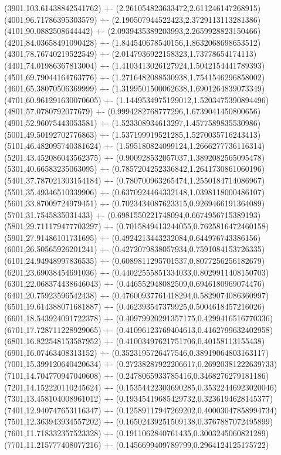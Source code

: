 {(3901,103.61438842541762) +- (2.261054823633472,2.611246147268915)
(4001,96.71786395303579) +- (2.190507944522423,2.3729113113281386)
(4101,90.0882508644442) +- (2.0939435389203993,2.2659928823150466)
(4201,84.03658491090428) +- (1.844540678540156,1.8632068698653512)
(4301,78.76740219522549) +- (2.0147936922158323,1.73778654174113)
(4401,74.01986367813004) +- (1.4103413026127924,1.5042154441789393)
(4501,69.79044164763776) +- (1.2716482088530938,1.7541546296858002)
(4601,65.38070506369999) +- (1.3199501500062638,1.6901264839073349)
(4701,60.961291630070605) +- (1.1449534975129012,1.5203475390894496)
(4801,57.0780792077679) +- (0.9994282768777296,1.6739041450800656)
(4901,52.96075443053581) +- (1.523308934613297,1.4577589835530986)
(5001,49.50192702776863) +- (1.537199919521285,1.5270035716243413)
(5101,46.482095740381624) +- (1.595180824099124,1.2666277736116314)
(5201,43.452086043562375) +- (0.900928532057037,1.3892082565095478)
(5301,40.66583235063095) +- (0.7857204252336842,1.2641730861060196)
(5401,37.787021303154184) +- (0.780700963265474,1.2550184714086967)
(5501,35.49346510339906) +- (0.6370924464332148,1.0398118000486107)
(5601,33.87009724979451) +- (0.7023434087623315,0.9269466191364089)
(5701,31.7545835031433) +- (0.6981550221748094,0.6674956715389193)
(5801,29.711179477703297) +- (0.7015849413244055,0.7625816472460158)
(5901,27.91486101731695) +- (0.4924213443232084,0.644976743386156)
(6001,26.50565926201241) +- (0.4272079838057934,0.7591084153726335)
(6101,24.94948997836535) +- (0.6089811295701537,0.8077256256182679)
(6201,23.69038454691036) +- (0.44022555851334033,0.8029911408150703)
(6301,22.068374438646043) +- (0.446552948082509,0.6946180969074476)
(6401,20.75923596542438) +- (0.47600937761418294,0.5829074086360997)
(6501,19.614388071681887) +- (0.462393547379925,0.5004618457216026)
(6601,18.543924091722378) +- (0.40979920291357175,0.4299416516770336)
(6701,17.728711228929065) +- (0.41096123769404613,0.4162799632402958)
(6801,16.822548153587952) +- (0.41003497621751706,0.40158113155438)
(6901,16.07463408313152) +- (0.3523195726477546,0.38919064803163117)
(7001,15.399120640420634) +- (0.27238287922206617,0.26920381222639733)
(7101,14.704770947040608) +- (0.2478065933785416,0.3468276279181186)
(7201,14.152220110245624) +- (0.15354422303690285,0.35322446923020046)
(7301,13.458104008961012) +- (0.19345419685429732,0.3236194628145377)
(7401,12.940747653116347) +- (0.12589117947269202,0.40003047858994734)
(7501,12.363943934557202) +- (0.16502439251509138,0.3767887072495899)
(7601,11.718332357523328) +- (0.1911062840761435,0.3003245060821289)
(7701,11.215777408077216) +- (0.1456699409789799,0.2964124125175722)
}
